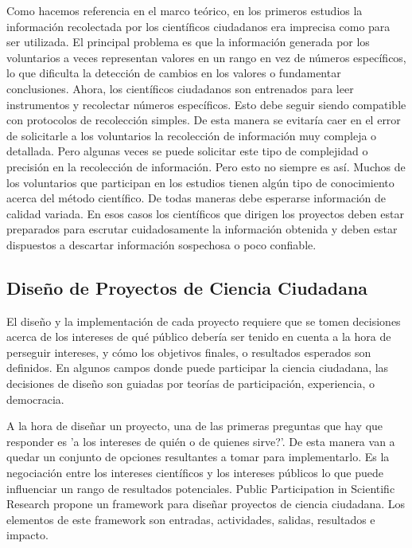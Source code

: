 	Como hacemos referencia en el marco teórico, en los primeros estudios la información recolectada por los científicos ciudadanos era imprecisa como para ser utilizada. El principal problema es que la información generada por los voluntarios a veces representan valores en un rango en vez de números específicos, lo que dificulta la detección de cambios en los valores o fundamentar conclusiones. Ahora, los científicos ciudadanos son entrenados para leer instrumentos y recolectar números específicos. Esto debe seguir siendo compatible con protocolos de recolección simples. De esta manera se evitaría caer en el error de solicitarle a los voluntarios la recolección de información muy compleja o detallada. Pero algunas veces se puede solicitar este tipo de complejidad o precisión en la recolección de información. Pero esto no siempre es así. Muchos de los voluntarios que participan en los estudios tienen algún tipo de conocimiento acerca del método científico. De todas maneras debe esperarse información de calidad variada. En esos casos los científicos que dirigen los proyectos deben estar preparados para escrutar cuidadosamente la información obtenida y deben estar dispuestos a descartar información sospechosa o poco confiable.\cite{cohn2008citizen} 
		
\subsection{Diseño de Proyectos de Ciencia Ciudadana}

	El diseño y la implementación de cada proyecto requiere que se tomen decisiones acerca de los intereses de qué público debería ser tenido en cuenta a la hora de perseguir intereses, y cómo los objetivos finales, o resultados esperados son definidos. En algunos campos donde puede participar la ciencia ciudadana, las decisiones de diseño son guiadas por teorías de participación, experiencia, o democracia.
	
	A la hora de diseñar un proyecto, una de las primeras preguntas que hay que responder es 'a los intereses de quién o de quienes sirve?'. De esta manera van a quedar un conjunto de opciones resultantes a tomar para implementarlo. Es la negociación entre los intereses científicos y los intereses públicos lo que puede influenciar un rango de resultados potenciales. Public Participation in Scientific Research \cite{shirk2012public} propone un framework para diseñar proyectos de ciencia ciudadana. Los elementos de este framework  son entradas, actividades, salidas, resultados e impacto. 
	
